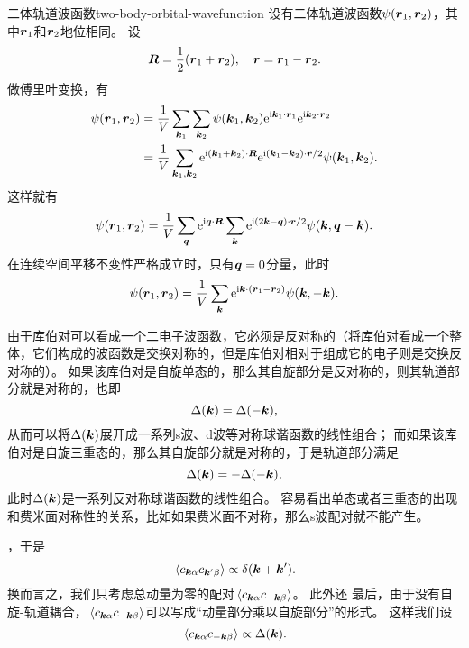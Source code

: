 \begin{back}{二体轨道波函数}{two-body-orbital-wavefunction}
    设有二体轨道波函数$\psi(\vb*{r}_1, \vb*{r}_2)$，其中$\vb*{r}_1$和$\vb*{r}_2$地位相同。
    设
    \begin{equation}
        \vb*{R} = \frac{1}{2} (\vb*{r}_1 + \vb*{r}_2), \quad \vb*{r} = \vb*{r}_1 - \vb*{r}_2.
    \end{equation}
    做傅里叶变换，有
    \[
        \begin{aligned}
            \psi(\vb*{r}_1, \vb*{r}_2) &= \frac{1}{V} \sum_{\vb*{k}_1} \sum_{\vb*{k}_2} \psi(\vb*{k}_1, \vb*{k}_2) \mathrm{e}^{\mathrm{i} \vb*{k}_1 \cdot \vb*{r}_1} \mathrm{e}^{\mathrm{i} \vb*{k}_2 \cdot \vb*{r}_2} \\
            &= \frac{1}{V} \sum_{\vb*{k}_1, \vb*{k}_2} \mathrm{e}^{\mathrm{i} (\vb*{k}_1 + \vb*{k}_2) \cdot \vb*{R}} \mathrm{e}^{\mathrm{i} (\vb*{k}_1 - \vb*{k}_2) \cdot \vb*{r} / 2} \psi(\vb*{k}_1, \vb*{k}_2).
        \end{aligned}
    \]
    这样就有
    \begin{equation}
        \psi(\vb*{r}_1, \vb*{r}_2) = \frac{1}{V} \sum_{\vb*{q}} \mathrm{e}^{\mathrm{i} \vb*{q} \cdot \vb*{R} } \sum_{\vb*{k}} \mathrm{e}^{\mathrm{i} (2 \vb*{k} - \vb*{q}) \cdot \vb*{r} / 2} \psi(\vb*{k}, \vb*{q} - \vb*{k}).
    \end{equation}
    在连续空间平移不变性严格成立时，只有$\vb*{q}=0$分量，此时
    \begin{equation}
        \psi(\vb*{r}_1, \vb*{r}_2) = \frac{1}{V} \sum_{\vb*{k}} \mathrm{e}^{\mathrm{i} \vb*{k} \cdot (\vb*{r}_1 - \vb*{r}_2)} \psi(\vb*{k}, -\vb*{k}).
    \end{equation}
\end{back}

由于库伯对可以看成一个二电子波函数，它必须是反对称的（将库伯对看成一个整体，它们构成的波函数是交换对称的，但是库伯对相对于组成它的电子则是交换反对称的）。
如果该库伯对是自旋单态的，那么其自旋部分是反对称的，则其轨道部分就是对称的，也即
\[
    \Delta(\vb*{k}) = \Delta(-\vb*{k}),
\]
从而可以将$\Delta(\vb*{k})$展开成一系列s波、d波等对称球谐函数的线性组合；
而如果该库伯对是自旋三重态的，那么其自旋部分就是对称的，于是轨道部分满足
\[
    \Delta(\vb*{k}) = -\Delta(-\vb*{k}),
\]
此时$\Delta(\vb*{k})$是一系列反对称球谐函数的线性组合。
容易看出单态或者三重态的出现和费米面对称性的关系，比如如果费米面不对称，那么s波配对就不能产生。

，于是
\[
    \expval*{{c}_{\vb*{k}\alpha} {c}_{\vb*{k}' \beta}} \propto \delta(\vb*{k} + \vb*{k}').
\]
换而言之，我们只考虑总动量为零的配对$\expval*{{c}_{\vb*{k} \alpha} {c}_{- \vb*{k} \beta}}$。
此外还
最后，由于没有自旋-轨道耦合，$\expval*{{c}_{\vb*{k} \alpha} {c}_{- \vb*{k} \beta}}$可以写成“动量部分乘以自旋部分”的形式。
这样我们设
\[
    \expval*{{c}_{\vb*{k} \alpha} {c}_{- \vb*{k} \beta}} \propto \Delta(\vb*{k}).
\]

